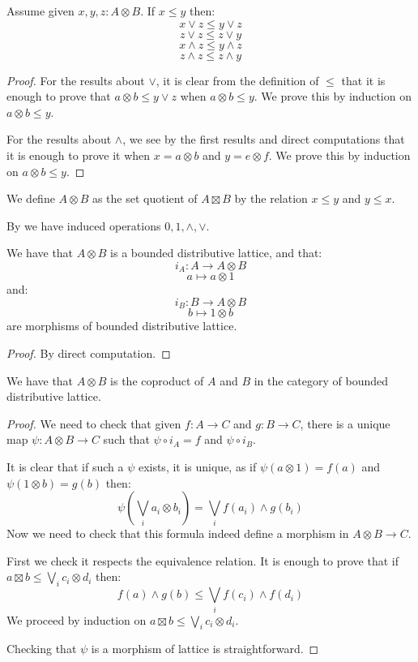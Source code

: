 \begin{lemma}\label{and-or-respect-leq}
Assume given $x,y,z:A\otimes B$. If $x\leq y$ then:
\[x\lor z \leq y\lor z\]
\[z\lor z \leq z\lor y\]
\[x\land z \leq y\land z\]
\[z\land z \leq z\land y\]
\end{lemma}

\begin{proof}
For the results about $\lor$, it is clear from the definition of $\leq$ that it is enough to prove that $a\otimes b\leq y\lor z$ when $a\otimes b \leq y$. We prove this by induction on $a\otimes b\leq y$.

For the results about $\land$, we see by the first results and direct computations that it is enough to prove it when $x=a\otimes b$ and $y=e\otimes f$. We prove this by induction on $a\otimes b \leq y$.
\end{proof}

\begin{definition}
We define $A\otimes B$ as the set quotient of $A\boxtimes B$ by the relation $x\leq y$ and $y\leq x$.

By  we have induced operations $0,1,\land,\lor$.
\end{definition}

\begin{lemma}
We have that $A\otimes B$ is a bounded distributive lattice, and that:
\[i_A:A\to A\otimes B\]
\[a\mapsto a\otimes 1\]
and:
\[i_B : B\to A\otimes B\]
\[b\mapsto 1\otimes b\]
are morphisms of bounded distributive lattice.
\end{lemma}

\begin{proof}
By direct computation.
\end{proof}

\begin{lemma}
We have that $A\otimes B$ is the coproduct of $A$ and $B$ in the category of bounded distributive lattice.
\end{lemma}

\begin{proof}
We need to check that given $f:A\to C$ and $g:B\to C$, there is a unique map $\psi:A\otimes B\to C$ such that $\psi\circ i_A = f$ and $\psi\circ i_B$.

It is clear that if such a $\psi$ exists, it is unique, as if $\psi(a\otimes 1) = f(a)$ and $\psi(1\otimes b) = g(b)$ then:
\[\psi(\bigvee_ia_i\otimes b_i) = \bigvee_i f(a_i)\land g(b_i)\]
Now we need to check that this formula indeed define a morphism in $A\otimes B\to C$.

First we check it respects the equivalence relation. It is enough to prove that if $a\boxtimes b \leq \bigvee_i c_i\otimes d_i$ then:
\[f(a)\land g(b) \leq \bigvee_i f(c_i)\land f(d_i)\] 
We proceed by induction on  $a\boxtimes b \leq \bigvee_i c_i\otimes d_i$.

Checking that $\psi$ is a morphism of lattice is straightforward.
\end{proof}

